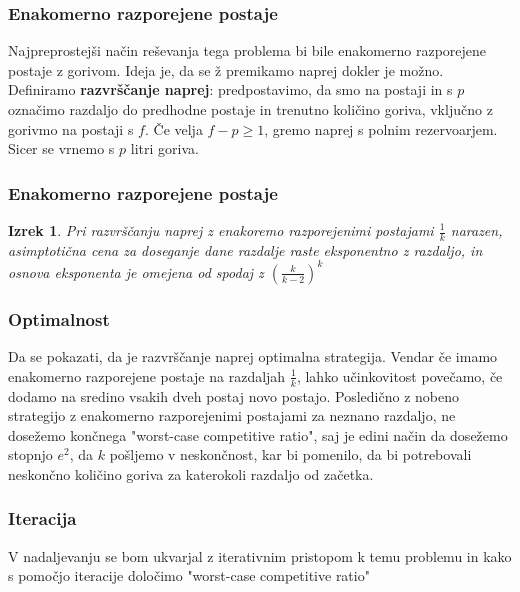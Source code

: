 \documentclass{beamer}
\newtheorem{izrek}{Izrek}
\begin{document}
 \begin{frame}
    \frametitle{Enakomerno razporejene postaje}
    Najpreprostejši način reševanja tega problema bi bile enakomerno razporejene postaje z gorivom. Ideja je, da se ž
    premikamo naprej dokler je možno. Definiramo \textbf{razvrščanje naprej}: predpostavimo, da smo na postaji in s $p$ 
    označimo razdaljo do predhodne postaje in trenutno količino goriva, vključno z gorivmo na postaji s $f$. Če velja 
    $f - p \geq 1$, gremo naprej s polnim rezervoarjem. Sicer se vrnemo s $p$ litri goriva. 
\end{frame}

 \begin{frame}
    \frametitle{Enakomerno razporejene postaje}
    \begin{izrek}
        Pri razvrščanju naprej z enakoremo razporejenimi postajami $\frac{1}{k}$ narazen, asimptotična
        cena za doseganje dane razdalje raste eksponentno z razdaljo, in osnova eksponenta je omejena od spodaj z
         $(\frac{k}{k-2})^k$
    \end{izrek}
\end{frame}

 \begin{frame}
    \frametitle{Optimalnost}
    Da se pokazati, da je razvrščanje naprej optimalna strategija. Vendar če imamo enakomerno razporejene 
    postaje na razdaljah $\frac{1}{k}$, lahko učinkovitost povečamo, če dodamo na sredino vsakih dveh postaj novo postajo. 
    Posledično z nobeno strategijo z enakomerno razporejenimi postajami za neznano razdaljo, ne dosežemo končnega "worst-case 
    competitive ratio", saj je edini način da dosežemo stopnjo $e^{2}$, da $k$ pošljemo v neskončnost, kar bi 
    pomenilo, da bi potrebovali neskončno količino goriva za katerokoli razdaljo od začetka.
    \end{frame}

 \begin{frame}
    \frametitle{Iteracija}
    V nadaljevanju se bom ukvarjal z iterativnim pristopom k temu problemu in kako s pomočjo iteracije 
    določimo "worst-case competitive ratio"
   \end{frame}
\end{document}
